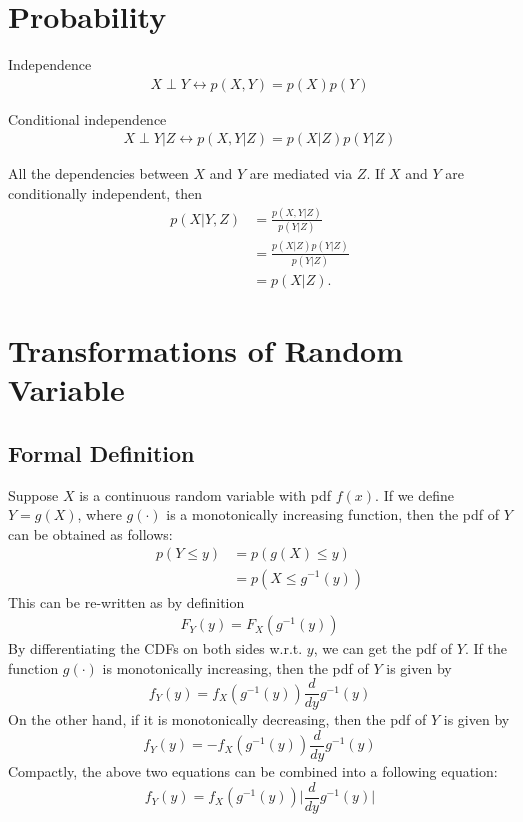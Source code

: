 \section{Probability}
\label{sec:intro_prob}

\begin{definition}{Independence}
	\begin{align*}
		X\perp Y \leftrightarrow p(X,Y)=p(X)p(Y)
	\end{align*}
\end{definition}
\begin{definition}{Conditional independence}
	\begin{align*}
		X\perp Y|Z \leftrightarrow p(X,Y|Z)=p(X|Z)p(Y|Z)
	\end{align*}
\end{definition}
All the dependencies between $X$ and $Y$ are mediated via $Z$. If $X$ and $Y$ are conditionally independent, then 
\begin{align*}
	p(X|Y,Z)&=\frac{p(X,Y|Z)}{p(Y|Z)}\\
	&=\frac{p(X|Z)p(Y|Z)}{p(Y|Z)}\\
	&=p(X|Z).
\end{align*}

\section{Transformations of Random Variable}
\subsection{Formal Definition}
Suppose $X$ is a continuous random variable with pdf $f(x)$. If we define $Y=g(X)$, where $g(\cdot)$ is a monotonically increasing function, then the pdf of $Y$ can be obtained as follows:
\begin{align*}
	p(Y\leq y) &= p(g(X)\leq y)\\
	& = p(X\leq g^{-1}(y))
\end{align*}
This can be re-written as by definition
\begin{align*}
F_Y(y) = F_X(g^{-1}(y))
\end{align*}
By differentiating the CDFs on both sides w.r.t. $y$, we can get the pdf of $Y$. If the function $g(\cdot)$ is monotonically increasing, then the pdf of $Y$ is given by
$$f_Y(y) = f_X(g^{-1}(y))\frac{d}{dy}g^{-1}(y)$$
On the other hand, if it is monotonically decreasing, then the pdf of $Y$ is given by
$$f_Y(y) = - f_X(g^{-1}(y))\frac{d}{dy}g^{-1}(y)$$
Compactly, the above two equations can be combined into a following equation:
$$f_Y(y) = f_X(g^{-1}(y))\Bigg|\frac{d}{dy}g^{-1}(y)\Bigg|$$

